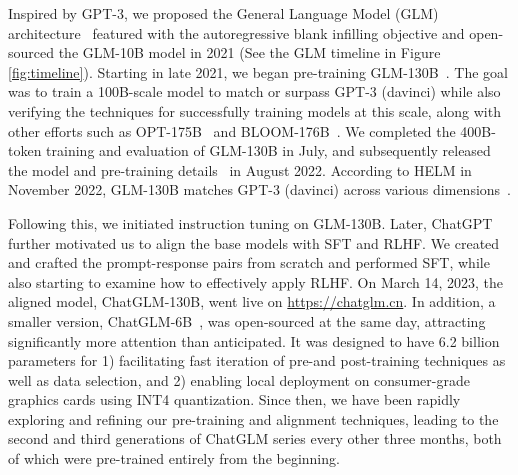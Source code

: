 Inspired by GPT-3, we proposed the General Language Model (GLM) architecture~\cite{du2022glm} featured with the autoregressive blank infilling objective and open-sourced the GLM-10B model in 2021 (See the GLM timeline in Figure \ref{fig:timeline}). 
Starting in late 2021, we began pre-training GLM-130B~\cite{zeng2022glm}. 
The goal was to train a 100B-scale model to match or surpass GPT-3 (davinci) while also verifying the techniques for successfully training models at this scale, along with  other efforts such as OPT-175B~\cite{zhang2022opt} and BLOOM-176B~\cite{scao2022bloom}. 
We completed the 400B-token training and evaluation of GLM-130B in July, and subsequently released the model and pre-training details~\cite{zeng2022glm} in August 2022. 
According to HELM in November 2022, GLM-130B matches GPT-3 (davinci) across various dimensions~\cite{liang2023holistic}. 


Following this, we initiated instruction tuning on GLM-130B. 
Later, ChatGPT further motivated us to align the base models with SFT and RLHF. 
We created and crafted the prompt-response pairs from scratch and performed SFT, while also starting to examine how to effectively apply RLHF. 
On March 14, 2023, the aligned model, ChatGLM-130B, went live on \url{https://chatglm.cn}. 
In addition, a smaller version, ChatGLM-6B~\cite{github:chatglm-6b}, was open-sourced at the same day, attracting significantly more attention than anticipated. 
It was designed to have 6.2 billion parameters for 1) facilitating fast iteration of pre-and post-training techniques as well as data selection, and 2) enabling local deployment on consumer-grade graphics cards using INT4 quantization. 
Since then, we have been rapidly exploring and refining our pre-training and alignment techniques, leading to the second and third generations of ChatGLM series every other three months, both of which were pre-trained entirely from the beginning. 


